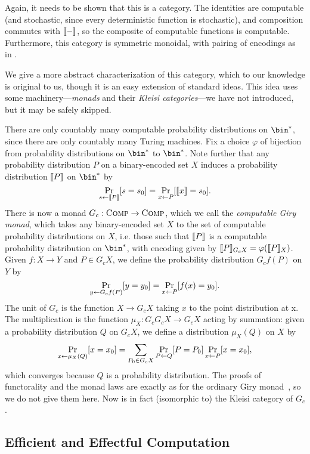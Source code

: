 Again, it needs to be shown that this is a category. The identities are
computable (and stochastic, since every deterministic function is stochastic),
and composition commutes with $\llbracket - \rrbracket$, so the composite of computable
functions is computable. Furthermore, this category is symmetric monoidal, with
pairing of encodings as in .

We give a more abstract characterization of this category, which to our
knowledge is original to us, though it is an easy extension of standard ideas.
This idea uses some machinery---\emph{monads} and their \emph{Kleisi
categories}---we have not introduced, but it may be safely skipped.

There are only countably many computable probability distributions on $\bin^*$,
since there are only countably many Turing machines. Fix a choice $\varphi$ of
bijection from probability distributions on $\bin^*$ to $\bin^*$. Note further
that any probability distribution $P$ on a binary-encoded set $X$ induces a
probability distribution $\llbracket P \rrbracket$ on $\bin^*$ by \[ \Pr_{s\leftarrow
\llbracket P \rrbracket}[s = s_0] = \Pr_{x\leftarrow P}[\llbracket x \rrbracket = s_0]. \] There is now a monad
$G_c: {\textsc{\text{Comp}}}\to{\textsc{\text{Comp}}}$, which we call the \emph{computable Giry
monad}, which takes any binary-encoded set $X$ to the set of computable
probability distributions on $X$, i.e. those such that $\llbracket P \rrbracket$ is a
computable probability distribution on $\bin^*$, with encoding given by
$\llbracket P \rrbracket_{G_c X} = \varphi(\llbracket P \rrbracket_X)$. Given $f: X\to Y$ and $P\in G_c
X$, we define the probability distribution $G_c f(P)$ on $Y$ by \[ \Pr_{y\leftarrow
  G_c f(P)}[y = y_0] = \Pr_{x\leftarrow P}[f(x) = y_0]. \] The unit of $G_c$ is the
  function $X\to G_c X$ taking $x$ to the point distribution at x. The
  multiplication is the function $\mu_X: G_c G_c X\to G_c X$ acting by
  summation: given a probability distribution $Q$ on $G_c X$, we define a
  distribution $\mu_X (Q)$ on $X$ by \begin{equation*}\label{eqn:giry-sum}
  \Pr_{x\leftarrow \mu_X(Q)}[x = x_0] = \sum_{P_0\in G_c X}
\Pr_{P\leftarrow Q}[P = P_0]\Pr_{x\leftarrow P}[x = x_0], \end{equation*}which converges
because $Q$ is a probability distribution. The proofs of functorality and the
monad laws are exactly as for the ordinary Giry monad~\cite{giry-1982}, so we do
not give them here. Now  is in fact (isomorphic to) the Kleisi
category of $G_c$.

\subsection{Efficient and Effectful Computation}

